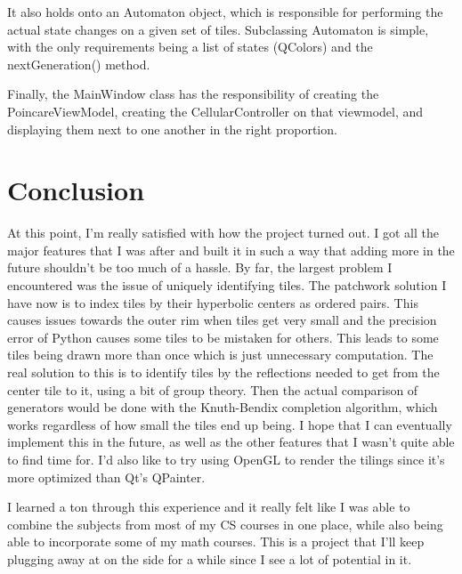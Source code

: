 \documentclass[letterpaper,12pt]{article}
\begin{document}
It also holds onto an Automaton object, which is responsible for performing the actual state changes on a given set of tiles. Subclassing Automaton is simple, with the only requirements being a list of states (QColors) and the nextGeneration() method. 

Finally, the MainWindow class has the responsibility of creating the PoincareViewModel, creating the CellularController on that viewmodel, and displaying them next to one another in the right proportion.

\section*{Conclusion}

At this point, I'm really satisfied with how the project turned out. I got all the major features that I was after and built it in such a way that adding more in the future shouldn't be too much of a hassle. By far, the largest problem I encountered was the issue of uniquely identifying tiles. The patchwork solution I have now is to index tiles by their hyperbolic centers as ordered pairs. This causes issues towards the outer rim when tiles get very small and the precision error of Python causes some tiles to be mistaken for others. This leads to some tiles being drawn more than once which is just unnecessary computation. The real solution to this is to identify tiles by the reflections needed to get from the center tile to it, using a bit of group theory. Then the actual comparison of generators would be done with the Knuth-Bendix completion algorithm, which works regardless of how small the tiles end up being. I hope that I can eventually implement this in the future, as well as the other features that I wasn't quite able to find time for. I'd also like to try using OpenGL to render the tilings since it's more optimized than Qt's QPainter. 

I learned a ton through this experience and it really felt like I was able to combine the subjects from most of my CS courses in one place, while also being able to incorporate some of my math courses. This is a project that I'll keep plugging away at on the side for a while since I see a lot of potential in it.\\
\end{document}
